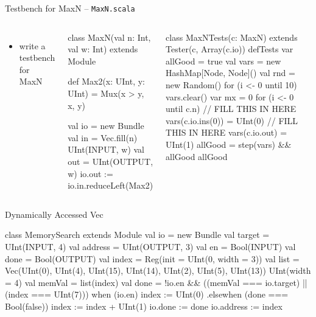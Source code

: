\documentclass[xcolor=pdflatex,dvipsnames,table]{beamer}
\begin{document}
\begin{frame}[fragile]{Testbench for MaxN -- \tt MaxN.scala}
\begin{columns}

\begin{itemize}
\item write a testbench for MaxN
\end{itemize}

{
\begin{scala}
class MaxN(val n: Int, val w: Int) 
    extends Module {

  def Max2(x: UInt, y: UInt) = 
    Mux(x > y, x, y)

  val io = new Bundle {
    val in = Vec.fill(n){ UInt(INPUT, w) }
    val out = UInt(OUTPUT, w)
  }
  io.out := io.in.reduceLeft(Max2)
}
\end{scala}
}


{
\begin{scala}
class MaxNTests(c: MaxN) 
    extends Tester(c, Array(c.io)) {
  defTests {
    var allGood = true
    val vars = new HashMap[Node, Node]()
    val rnd  = new Random()
    for (i <- 0 until 10) {
      vars.clear()
      var mx = 0
      for (i <- 0 until c.n) {
        // FILL THIS IN HERE
        vars(c.io.ins(0)) = UInt(0)
      }
      // FILL THIS IN HERE
      vars(c.io.out) = UInt(1)
      allGood = step(vars) && allGood
    }
    allGood
  }
}
\end{scala}
}
\end{columns}
\end{frame}

\begin{frame}[fragile]{Dynamically Accessed Vec}
\begin{scala}
class MemorySearch extends Module {
  val io = new Bundle {
    val target  = UInt(INPUT,  4)
    val address = UInt(OUTPUT, 3)
    val en      = Bool(INPUT)
    val done    = Bool(OUTPUT)
  }
  val index  = Reg(init = UInt(0, width = 3))
  val list   = Vec(UInt(0), UInt(4), UInt(15), UInt(14), 
                   UInt(2), UInt(5), UInt(13)){ UInt(width = 4) }
  val memVal = list(index)
  val done = !io.en && ((memVal === io.target) || (index === UInt(7)))
  when (io.en) {
    index := UInt(0)
  } .elsewhen (done === Bool(false)) {
    index := index + UInt(1)
  }
  io.done    := done
  io.address := index
}
\end{scala}
\end{frame}
\end{document}
